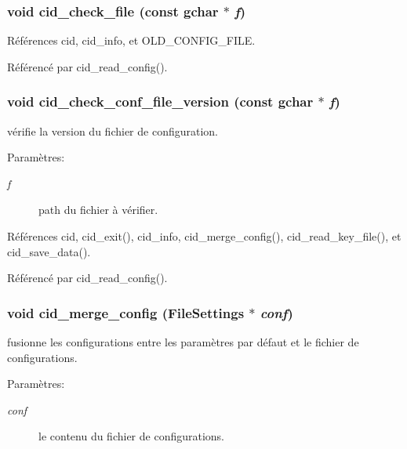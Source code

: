 \subsubsection{\setlength{\rightskip}{0pt plus 5cm}void cid\_\-check\_\-file (const gchar $\ast$ {\em f})}\label{cid-config_8c_f3e51a66443cd9c14a7f8c1e116a99c8}




Références cid, cid\_\-info, et OLD\_\-CONFIG\_\-FILE.

Référencé par cid\_\-read\_\-config().
\subsubsection{\setlength{\rightskip}{0pt plus 5cm}void cid\_\-check\_\-conf\_\-file\_\-version (const gchar $\ast$ {\em f})}\label{cid-config_8c_8649145737989647a1fb2ebc8e8e9f74}


vérifie la version du fichier de configuration. \begin{Desc}
\item[Paramètres:]
\begin{description}
\item[{\em f}]path du fichier à vérifier. \end{description}
\end{Desc}


Références cid, cid\_\-exit(), cid\_\-info, cid\_\-merge\_\-config(), cid\_\-read\_\-key\_\-file(), et cid\_\-save\_\-data().

Référencé par cid\_\-read\_\-config().
\subsubsection{\setlength{\rightskip}{0pt plus 5cm}void cid\_\-merge\_\-config ({\bf FileSettings} $\ast$ {\em conf})}\label{cid-config_8c_4f844443b05d6ce433181abd4cc27b22}


fusionne les configurations entre les paramètres par défaut et le fichier de configurations. \begin{Desc}
\item[Paramètres:]
\begin{description}
\item[{\em conf}]le contenu du fichier de configurations. \end{description}
\end{Desc}


